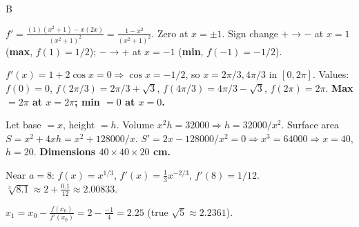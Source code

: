 \documentclass[11pt]{article}
\begin{document}
\begin{answers}{B}
\item $f' = \tfrac{(1)(x^2+1) - x(2x)}{(x^2+1)^2} = \tfrac{1 - x^2}{(x^2+1)^2}$. Zero at $x = \pm 1$. Sign change $+\to-$ at $x = 1$ (\textbf{max}, $f(1)=1/2$); $-\to+$ at $x = -1$ (\textbf{min}, $f(-1)=-1/2$).
\item $f'(x) = 1 + 2\cos x = 0 \Rightarrow \cos x = -1/2$, so $x = 2\pi/3, 4\pi/3$ in $[0,2\pi]$. Values: $f(0)=0$, $f(2\pi/3) = 2\pi/3 + \sqrt 3$, $f(4\pi/3) = 4\pi/3 - \sqrt 3$, $f(2\pi) = 2\pi$. \textbf{Max $= 2\pi$ at $x=2\pi$; min $=0$ at $x=0$.}
\item Let base $=x$, height $=h$. Volume $x^2 h = 32000 \Rightarrow h = 32000/x^2$. Surface area $S = x^2 + 4xh = x^2 + 128000/x$. $S' = 2x - 128000/x^2 = 0 \Rightarrow x^3 = 64000 \Rightarrow x = 40$, $h = 20$. \textbf{Dimensions $40 \times 40 \times 20$ cm.}
\item Near $a=8$: $f(x) = x^{1/3}$, $f'(x) = \tfrac{1}{3} x^{-2/3}$, $f'(8) = 1/12$. $\sqrt[3]{8.1} \approx 2 + \tfrac{0.1}{12} \approx \boxed{2.00833}$.
\item $x_1 = x_0 - \tfrac{f(x_0)}{f'(x_0)} = 2 - \tfrac{-1}{4} = \boxed{2.25}$ (true $\sqrt 5 \approx 2.2361$).
\end{answers}
\end{document}
